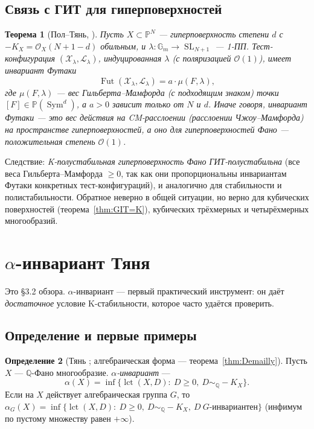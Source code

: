 \documentclass[11pt,a4paper]{article}
\theoremstyle{plain}
\newtheorem{theorem}{Теорема}[section]
\theoremstyle{definition}
\newtheorem{definition}[theorem]{Определение}
\theoremstyle{remark}
\newcommand{\Q}{\mathbb{Q}}
\newcommand{\PP}{\mathbb{P}}
\newcommand{\Gm}{\mathbb{G}_m}
\newcommand{\cO}{\mathcal{O}}
\newcommand{\cL}{\mathcal{L}}
\newcommand{\cX}{\mathcal{X}}
\DeclareMathOperator{\SL}{SL}
\DeclareMathOperator{\Sym}{Sym}
\DeclareMathOperator{\Fut}{Fut}
\DeclareMathOperator{\lct}{lct}
\begin{document}
\subsection{Связь с ГИТ для гиперповерхностей}

\begin{theorem}[{Пол--Тянь, \cite{PT}}]\label{thm:PT}
Пусть $X\subset\PP^N$ --- гиперповерхность степени $d$ с $-K_X=\cO_X(N+1-d)$ обильным, и
$\lambda\colon\Gm\to\SL_{N+1}$ --- 1-ПП. Тест-конфигурация $(\cX_\lambda,\cL_\lambda)$, индуцированная
$\lambda$ (с поляризацией $\cO(1)$), имеет инвариант Футаки
\[
\Fut(\cX_\lambda,\cL_\lambda)=a\cdot\mu(F,\lambda),
\]
где $\mu(F,\lambda)$ --- вес Гильберта--Мамфорда (с подходящим знаком) точки $[F]\in\PP(\Sym^d)$,
а $a>0$ зависит только от $N$ и $d$. Иначе говоря, инвариант Футаки --- это вес действия
на \emph{CM-расслоении} (расслоении Чжоу--Мамфорда) на пространстве гиперповерхностей, а оно
для гиперповерхностей Фано --- положительная степень $\cO(1)$.
\end{theorem}

Следствие: \emph{K-полустабильная гиперповерхность Фано ГИТ-полустабильна} (все веса
Гильберта--Мамфорда $\ge0$, так как они пропорциональны инвариантам Футаки конкретных
тест-конфигураций), и аналогично для стабильности и полистабильности. Обратное неверно в общей
ситуации, но верно для кубических поверхностей (теорема~\ref{thm:GIT=K}), кубических трёхмерных и
четырёхмерных многообразий.

\section{$\alpha$-инвариант Тяня}\label{sec:alpha}

Это \S3.2 обзора. $\alpha$-инвариант --- первый практический инструмент: он даёт \emph{достаточное}
условие K-стабильности, которое часто удаётся проверить.

\subsection{Определение и первые примеры}

\begin{definition}[{Тянь \cite{Tia87}; алгебраическая форма --- теорема~\ref{thm:Demailly}}]\label{def:alpha}
Пусть $X$ --- $\Q$-Фано многообразие. \emph{$\alpha$-инвариант} ---
\[
\alpha(X)=\inf\{\lct(X,D):\ D\ge0,\ D\sim_\Q-K_X\}.
\]
Если на $X$ действует алгебраическая группа $G$, то
$\alpha_G(X)=\inf\{\lct(X,D):\ D\ge0,\ D\sim_\Q-K_X,\ D\ \text{$G$-инвариантен}\}$ (инфимум по
пустому множеству равен $+\infty$).
\end{definition}
\end{document}
